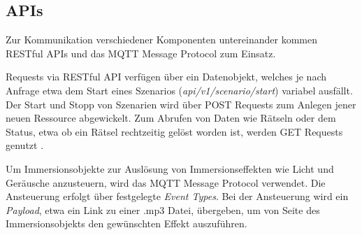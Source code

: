 \newpage
\subsection{APIs}

Zur Kommunikation verschiedener Komponenten untereinander kommen RESTful APIs und das MQTT Message Protocol zum Einsatz. 

Requests via RESTful API verfügen über ein Datenobjekt, welches je nach Anfrage etwa dem Start eines Szenarios (\textit{api/v1/scenario/start}) variabel ausfällt. Der Start und Stopp von Szenarien wird über POST Requests zum Anlegen jener neuen Ressource abgewickelt. Zum Abrufen von Daten wie Rätseln oder dem Status, etwa ob ein Rätsel rechtzeitig gelöst worden ist, werden GET Requests genutzt \autocite{masse2011rest}.

Um Immersionsobjekte zur Auslösung von Immersionseffekten wie Licht und Geräusche anzusteuern, wird das MQTT Message Protocol verwendet. Die Ansteuerung erfolgt über festgelegte \textit{Event Types}. Bei der Ansteuerung wird ein \textit{Payload}, etwa ein Link zu einer .mp3 Datei, übergeben, um von Seite des Immersionsobjekts den gewünschten Effekt auszuführen.
